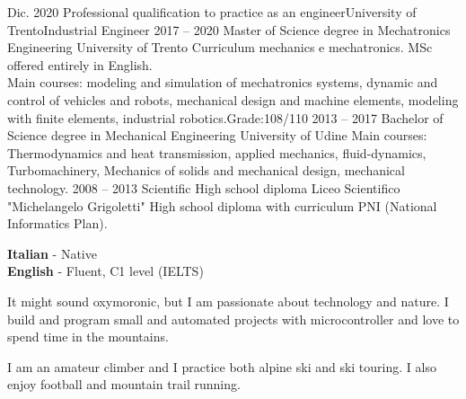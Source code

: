 \documentclass[9pt]{developercv_mattia} %
\begin{document}
\begin{entrylist}
	\entry
		{Dic. 2020}
		{Professional qualification to practice as an engineer}{University of Trento}{Industrial Engineer}
	\entry
		{2017 -- 2020}
		{Master of Science degree in Mechatronics Engineering}
		{University of Trento}
		{Curriculum mechanics e mechatronics. MSc offered entirely in English.\\
		Main courses: modeling and simulation of mechatronics systems, dynamic and control of vehicles and robots, mechanical design and machine elements, modeling with finite elements, industrial robotics.\hfill Grade:108/110}
	\entry
		{2013 -- 2017}
		{Bachelor of Science degree in Mechanical Engineering}
		{University of Udine}
		{Main courses: Thermodynamics and heat transmission, applied mechanics, fluid-dynamics, Turbomachinery, Mechanics of solids and mechanical design, mechanical technology.} %
	\entry
		{2008 -- 2013}
		{Scientific High school diploma}
		{Liceo Scientifico "Michelangelo Grigoletti"}
		{High school diploma with curriculum PNI (National Informatics Plan). } %
\end{entrylist}
%
%
\begin{minipage}[t]{0.32\textwidth}
	\vspace{-\baselineskip} %
%
	\textbf{Italian} - Native\\
	\textbf{English}  - Fluent, C1 level (IELTS)
%
\end{minipage}
\hfill
\begin{minipage}[t]{0.32\textwidth}
	\vspace{-\baselineskip} %
	It might sound oxymoronic, but I am passionate about technology and nature. 
	I build and program small and automated projects with microcontroller and love to spend time in the mountains.
%
\end{minipage}
\hfill
\begin{minipage}[t]{0.32\textwidth}
	\vspace{-\baselineskip} %
%
	I am an amateur climber and I practice both alpine ski and ski touring. I also enjoy football and mountain trail running. 
%
\end{minipage}

\vfill
\end{document}
